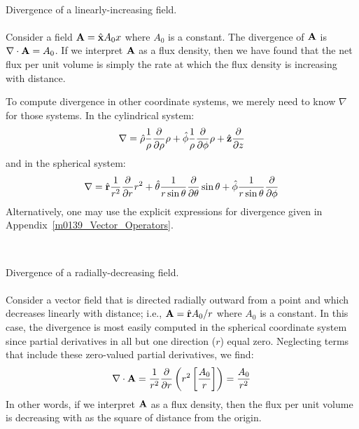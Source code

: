 ~\\ \begin{example} 
\begin{mdframed}[backgroundcolor=brown!20,linecolor=brown!20]\raggedright
Divergence of a linearly-increasing field.
\\~\\
Consider a field ${\bf A}=\hat{\bf x}A_0 x$ where $A_0$ is a constant.
The divergence of ${\bf A}$ is $\nabla \cdot {\bf A} = A_0$.
If we interpret ${\bf A}$ as a flux density, then we have found that the net flux per unit volume is simply the rate at which the flux density is increasing with distance.
\end{mdframed} \end{example}

To compute divergence in other coordinate systems, we merely need to know $\nabla$ for those systems.
In the cylindrical system:
\begin{equation}
\nabla = \hat{\bf \rho}\frac{1}{\rho}\frac{\partial}{\partial \rho}\rho
+\hat{\bf \phi}\frac{1}{\rho}\frac{\partial}{\partial \phi}\rho
+ \hat{\bf z}\frac{\partial}{\partial z} 
\end{equation}
%
and in the spherical system:
%
\begin{equation}
\nabla = \hat{\bf r}\frac{1}{r^2}\frac{\partial}{\partial r}r^2
+\hat{\bf \theta}\frac{1}{r\sin\theta}\frac{\partial}{\partial \theta}\sin\theta
+\hat{\bf \phi}\frac{1}{r\sin\theta}\frac{\partial}{\partial \phi}
\label{eDelSph}
\end{equation}
%
Alternatively, one may use the explicit expressions for divergence given in Appendix~\ref{m0139_Vector_Operators}.

~\\ \begin{example} 
\begin{mdframed}[backgroundcolor=brown!20,linecolor=brown!20]\raggedright
Divergence of a radially-decreasing field.
\\~\\
Consider a vector field that is directed radially outward from a point and which decreases linearly with distance; i.e.,
${\bf A}=\hat{\bf r}A_0/r$ where $A_0$ is a constant.
In this case, the divergence is most easily computed in the spherical coordinate system since partial derivatives in all but one direction ($r$) equal zero.
Neglecting terms that include these zero-valued partial derivatives, we find:
%
\begin{equation}
\nabla \cdot {\bf A} 
= \frac{1}{r^2}\frac{\partial}{\partial r}\left( r^2 \left[ \frac{A_0}{r} \right] \right) 
= \frac{A_0}{r^2}
\end{equation}
%
In other words, if we interpret ${\bf A}$ as a flux density, then the flux per unit volume is decreasing with as the square of distance from the origin.
\end{mdframed}\end{example}

